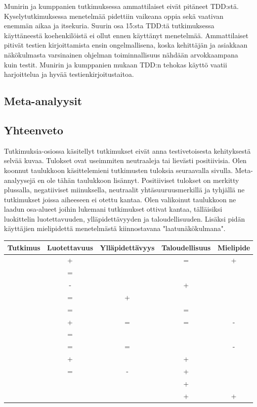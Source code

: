 \documentclass[finnish]{tktltiki2}
\theoremstyle{definition}
\theoremstyle{remark}
\begin{document}
Munirin ja kumppanien \cite{Munir14} tutkimuksessa ammattilaiset eivät pitäneet TDD:stä. Kyselytutkimuksessa menetelmää pidettiin vaikeana oppia sekä vaativan enemmän aikaa ja itsekuria. Suurin osa 15:sta TDD:tä tutkimuksessa käyttäneestä koehenkilöistä ei ollut ennen käyttänyt menetelmää. Ammattilaiset pitivät testien kirjoittamista ensin ongelmallisena, koska kehittäjän ja asiakkaan näkökulmasta varsinainen ohjelman toiminnallisuus nähdään arvokkaampana kuin testit. Munirin ja kumppanien mukaan TDD:n tehokas käyttö vaatii harjoittelua ja hyvää testienkirjoitustaitoa.


\subsection{Meta-analyysit}



\subsection{Yhteenveto}



Tutkimuksia-osiossa käsitellyt tutkimukset eivät anna testivetoisesta kehityksestä selvää kuvaa. Tulokset ovat useimmiten neutraaleja tai lievästi positiivisia.
  Olen koonnut taulukkoon käsittelemieni tutkimusten tuloksia seuraavalla sivulla. Meta-analyysejä en ole tähän taulukkoon lisännyt. Positiiviset tulokset on merkitty plussalla, negatiiviset miinuksella, neutraalit yhtäsuuruusmerkillä ja tyhjällä ne tutkimukset joissa aiheeseen ei otettu kantaa. Olen valikoinut taulukkoon ne laadun osa-alueet joihin lukemani tutkimukset ottivat kantaa, tälläisiksi luokittelin luotettavuuden, ylläpidettävyyden ja taloudellisuuden. Lisäksi pidän käyttäjien mielipidettä menetelmästä kiinnostavana "laatunäkökulmana".

\begin{tabular}{| l | c | c | c | c |}
\hline
  Tutkimus & Luotettavuus & Ylläpidettävyys & Taloudellisuus & Mielipide \\ \hline
\cite{George04} 	& + &  & = & + \\ \hline
\cite{Wilkerson12} 	& = &  &   &   \\ \hline
\cite{Erdogmus05} 	& - &  	& + &   \\ \hline
\cite{Causevic12} 	& = & + &   &   \\ \hline
\cite{Canfora06} 	& = &  & = &   \\ \hline
\cite{Pancur11} 	& + & = & = & - \\ \hline
\cite{Wilkerson12} 	& = &  &   &   \\ \hline
\cite{Munir14} 	& = & = &   & - \\ \hline
\cite{Nagappan08} 	& + &  & + &   \\ \hline
\cite{Siniaalto07} 	& = & - & + &   \\ \hline
\cite{Madeyski07} 	&   &   & + &   \\ \hline
\cite{Latorre14}	&   &   & + & + \\ \hline
\end{tabular}
\\
\\
\end{document}
